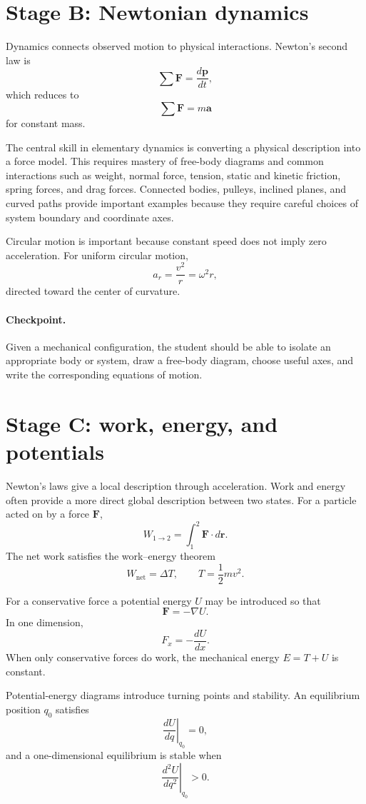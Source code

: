 \section{Stage B: Newtonian dynamics}

Dynamics connects observed motion to physical interactions.  Newton's second law is
\[
\sum \mathbf{F}=\frac{d\mathbf{p}}{dt},
\]
which reduces to
\[
\sum \mathbf{F}=m\mathbf{a}
\]
for constant mass.

The central skill in elementary dynamics is converting a physical description into a force model.
This requires mastery of free-body diagrams and common interactions such as weight, normal force,
tension, static and kinetic friction, spring forces, and drag forces.  Connected bodies, pulleys,
inclined planes, and curved paths provide important examples because they require careful choices
of system boundary and coordinate axes.

Circular motion is important because constant speed does not imply zero acceleration.  For uniform
circular motion,
\[
a_r=\frac{v^2}{r}=\omega^2 r,
\]
directed toward the center of curvature.

\paragraph{Checkpoint.}
Given a mechanical configuration, the student should be able to isolate an appropriate body or
system, draw a free-body diagram, choose useful axes, and write the corresponding equations of
motion.

\section{Stage C: work, energy, and potentials}

Newton's laws give a local description through acceleration.  Work and energy often provide a more
direct global description between two states.  For a particle acted on by a force $\mathbf F$,
\[
W_{1\to2}=\int_1^2 \mathbf F\cdot d\mathbf r.
\]
The net work satisfies the work--energy theorem
\[
W_{\mathrm{net}}=\Delta T,
\qquad
T=\frac12 mv^2.
\]

For a conservative force a potential energy $U$ may be introduced so that
\[
\mathbf F=-\nabla U.
\]
In one dimension,
\[
F_x=-\frac{dU}{dx}.
\]
When only conservative forces do work, the mechanical energy $E=T+U$ is constant.

Potential-energy diagrams introduce turning points and stability.  An equilibrium position $q_0$
satisfies
\[
\left.\frac{dU}{dq}\right|_{q_0}=0,
\]
and a one-dimensional equilibrium is stable when
\[
\left.\frac{d^2U}{dq^2}\right|_{q_0}>0.
\]

